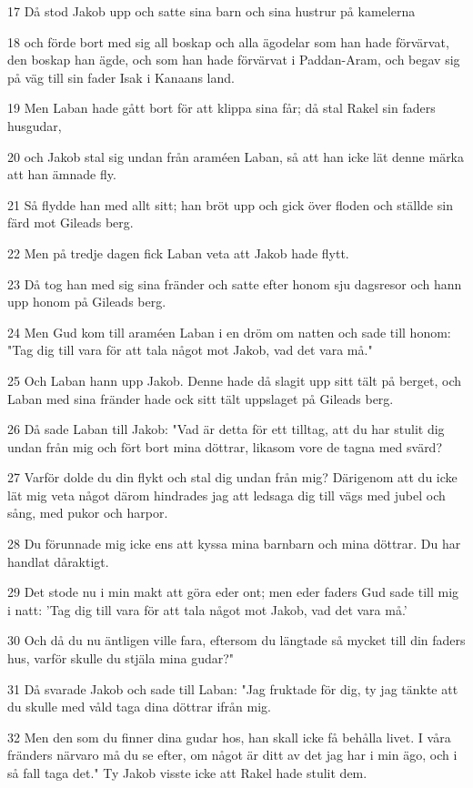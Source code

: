 \par 17 Då stod Jakob upp och satte sina barn och sina hustrur på kamelerna
\par 18 och förde bort med sig all boskap och alla ägodelar som han hade förvärvat, den boskap han ägde, och som han hade förvärvat i Paddan-Aram, och begav sig på väg till sin fader Isak i Kanaans land.
\par 19 Men Laban hade gått bort för att klippa sina får; då stal Rakel sin faders husgudar,
\par 20 och Jakob stal sig undan från araméen Laban, så att han icke lät denne märka att han ämnade fly.
\par 21 Så flydde han med allt sitt; han bröt upp och gick över floden och ställde sin färd mot Gileads berg.
\par 22 Men på tredje dagen fick Laban veta att Jakob hade flytt.
\par 23 Då tog han med sig sina fränder och satte efter honom sju dagsresor och hann upp honom på Gileads berg.
\par 24 Men Gud kom till araméen Laban i en dröm om natten och sade till honom: "Tag dig till vara för att tala något mot Jakob, vad det vara må."
\par 25 Och Laban hann upp Jakob. Denne hade då slagit upp sitt tält på berget, och Laban med sina fränder hade ock sitt tält uppslaget på Gileads berg.
\par 26 Då sade Laban till Jakob: "Vad är detta för ett tilltag, att du har stulit dig undan från mig och fört bort mina döttrar, likasom vore de tagna med svärd?
\par 27 Varför dolde du din flykt och stal dig undan från mig? Därigenom att du icke lät mig veta något därom hindrades jag att ledsaga dig till vägs med jubel och sång, med pukor och harpor.
\par 28 Du förunnade mig icke ens att kyssa mina barnbarn och mina döttrar. Du har handlat dåraktigt.
\par 29 Det stode nu i min makt att göra eder ont; men eder faders Gud sade till mig i natt: 'Tag dig till vara för att tala något mot Jakob, vad det vara må.'
\par 30 Och då du nu äntligen ville fara, eftersom du längtade så mycket till din faders hus, varför skulle du stjäla mina gudar?"
\par 31 Då svarade Jakob och sade till Laban: "Jag fruktade för dig, ty jag tänkte att du skulle med våld taga dina döttrar ifrån mig.
\par 32 Men den som du finner dina gudar hos, han skall icke få behålla livet. I våra fränders närvaro må du se efter, om något är ditt av det jag har i min ägo, och i så fall taga det." Ty Jakob visste icke att Rakel hade stulit dem.
